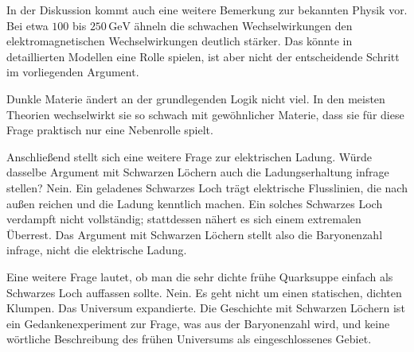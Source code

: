 In der Diskussion kommt auch eine weitere Bemerkung zur bekannten Physik vor. Bei etwa \(100\) bis \(250\,\mathrm{GeV}\) ähneln die schwachen Wechselwirkungen den elektromagnetischen Wechselwirkungen deutlich stärker. Das könnte in detaillierten Modellen eine Rolle spielen, ist aber nicht der entscheidende Schritt im vorliegenden Argument.

Dunkle Materie ändert an der grundlegenden Logik nicht viel. In den meisten Theorien wechselwirkt sie so schwach mit gewöhnlicher Materie, dass sie für diese Frage praktisch nur eine Nebenrolle spielt.

\begin{classroomqa}
\end{classroomqa}

Anschließend stellt sich eine weitere Frage zur elektrischen Ladung. Würde dasselbe Argument mit Schwarzen Löchern auch die Ladungserhaltung infrage stellen? Nein. Ein geladenes Schwarzes Loch trägt elektrische Flusslinien, die nach außen reichen und die Ladung kenntlich machen. Ein solches Schwarzes Loch verdampft nicht vollständig; stattdessen nähert es sich einem extremalen Überrest. Das Argument mit Schwarzen Löchern stellt also die Baryonenzahl infrage, nicht die elektrische Ladung.

Eine weitere Frage lautet, ob man die sehr dichte frühe Quarksuppe einfach als Schwarzes Loch auffassen sollte. Nein. Es geht nicht um einen statischen, dichten Klumpen. Das Universum expandierte. Die Geschichte mit Schwarzen Löchern ist ein Gedankenexperiment zur Frage, was aus der Baryonenzahl wird, und keine wörtliche Beschreibung des frühen Universums als eingeschlossenes Gebiet.

\begin{classroomqa}
\end{classroomqa}


